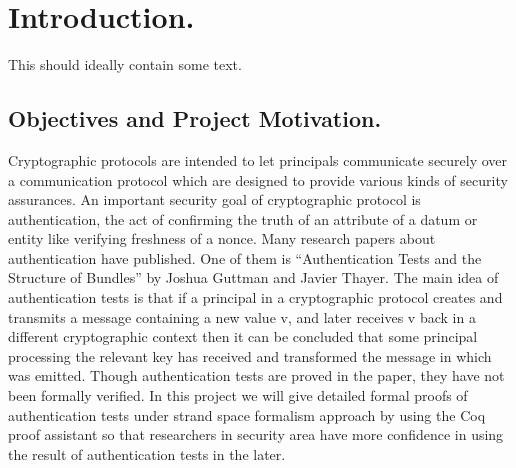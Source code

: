 \chapter{Introduction.}
This should ideally contain some text.

\section{Objectives and Project Motivation.}

Cryptographic protocols are intended to let principals communicate securely over a communication protocol which are designed to provide various kinds of security assurances. An important security goal of cryptographic protocol is authentication, the act of confirming the truth of an attribute of a datum or entity like verifying freshness of a nonce. Many research papers about authentication have published. One of them is “Authentication Tests and the Structure of Bundles” by Joshua Guttman and Javier Thayer. The main idea of authentication tests is that if a principal in a cryptographic protocol creates and transmits a message containing a new value v, and later receives v back in a different cryptographic context then it can be concluded that some principal processing the relevant key has received and transformed the message in which  was emitted. Though authentication tests are proved in the paper, they have not been formally verified. In this project we will give detailed formal proofs of authentication tests under strand space formalism approach by using the Coq proof assistant so that researchers in security area have more confidence in using the result of authentication tests in the later.

